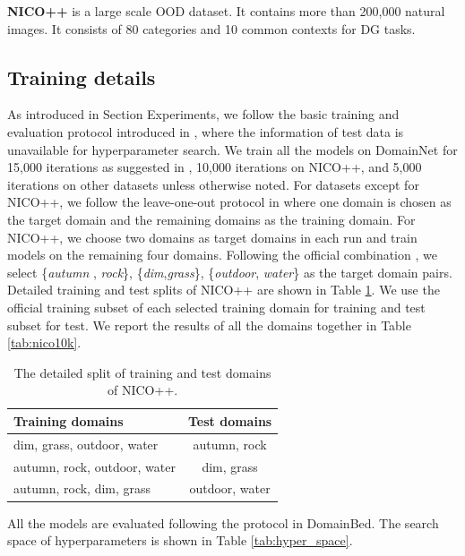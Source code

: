 \textbf{NICO++} \cite{zhang2022nico++} is a large scale OOD dataset. It contains more than 200,000 natural images. It consists of 80 categories and 10 common contexts for DG tasks.



\subsection{Training details}
\label{sec:training_details}
As introduced in Section Experiments, we follow the basic training and evaluation protocol introduced in \cite{gulrajani2020search}, where the information of test data is unavailable for hyperparameter search. 
We train all the models on DomainNet for 15,000 iterations as suggested in \cite{cha2021swad}, 10,000 iterations on NICO++, and 5,000 iterations on other datasets unless otherwise noted. 
For datasets except for NICO++, we follow the leave-one-out protocol in \cite{gulrajani2020search} where one domain is chosen as the target domain and the remaining domains as the training domain.
For NICO++, we choose two domains as target domains in each run and train models on the remaining four domains. Following the official combination \cite{zhang2022nico++}, we select \{\textit{autumn
}, \textit{rock}\}, \{\textit{dim},\textit{grass}\}, \{\textit{outdoor}, \textit{water}\} as the target domain pairs. Detailed training and test splits of NICO++ are shown in Table \ref{tab:nico_split}. We use the official training subset of each selected training domain for training and test subset for test. We report the results of all the domains together in Table \ref{tab:nico10k}.

\begin{table}[th]
\centering
\caption{The detailed split of training and test domains of NICO++.}
\begin{tabular}{l|c}
\toprule
Training domains & Test domains \\
\midrule
  dim, grass, outdoor, water & autumn, rock \\ 
 autumn, rock, outdoor, water & dim, grass \\
autumn, rock, dim, grass &  outdoor, water \\

\bottomrule
\end{tabular}
\label{tab:nico_split}
\end{table}

All the models are evaluated following the protocol in DomainBed. The search space of hyperparameters is shown in Table \ref{tab:hyper_space}.

